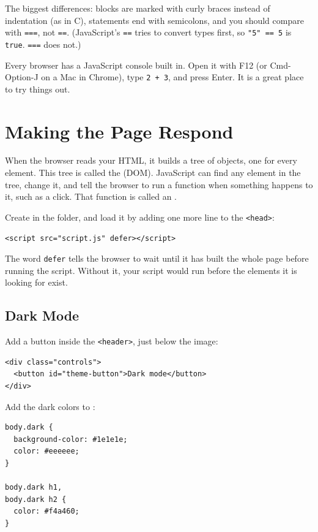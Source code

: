 The biggest differences: blocks are marked with curly braces instead of indentation (as in C),
statements end with semicolons, and you should compare with \verb|===|, not \verb|==|. (JavaScript's
\verb|==| tries to convert types first, so \verb|"5" == 5| is \verb|true|. \verb|===| does not.)

Every browser has a JavaScript console built in. Open it with F12 (or Cmd-Option-J on a Mac in Chrome),
type \verb|2 + 3|, and press Enter. It is a great place to try things out.

\section{Making the Page Respond}
When the browser reads your HTML, it builds a tree of objects, one for every element. This tree is called
the  (DOM). JavaScript can find any element in the tree, change it, and
tell the browser to run a function when something happens to it, such as a click. That function is
called an .

Create  in the  folder, and load it by adding one more line to the
\verb|<head>|:

\begin{verbatim}
<script src="script.js" defer></script>
\end{verbatim}

The word \verb|defer| tells the browser to wait until it has built the whole page before running the
script. Without it, your script would run before the elements it is looking for exist.

\subsection{Dark Mode}
Add a button inside the \verb|<header>|, just below the image:

\begin{verbatim}
<div class="controls">
  <button id="theme-button">Dark mode</button>
</div>
\end{verbatim}

Add the dark colors to :

\begin{verbatim}
body.dark {
  background-color: #1e1e1e;
  color: #eeeeee;
}

body.dark h1,
body.dark h2 {
  color: #f4a460;
}
\end{verbatim}

